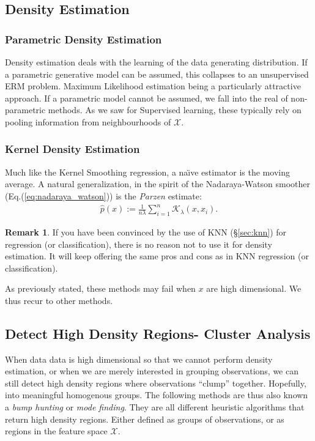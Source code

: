 \documentclass[12pt,a4paper]{article}
\theoremstyle{plain}
\theoremstyle{definition}
\newtheorem{remark}{Remark}
\newcommand{\naive}{na\"{\i}ve }
\newcommand{\pdf}{p}
\newcommand{\kernel}{\mathcal{K}}
\newcommand{\featureS}{\mathcal{X}}
\begin{document}
\subsection{Density Estimation}
\label{sec:density_estimation}

\subsubsection{Parametric Density Estimation}
Density estimation deals with the learning of the data generating distribution.
If a parametric generative model can be assumed, this collapses to an unsupervised ERM problem. 
Maximum Likelihood estimation being a particularly attractive approach.
If a parametric model cannot be assumed, we fall into the real of non-parametric methods. As we saw for Supervised learning, these typically rely on pooling information from neighbourhoods of $\featureS$.

\subsubsection{Kernel Density Estimation}

Much like the Kernel Smoothing regression, a \naive estimator is the moving average.
A natural generalization, in the spirit of the Nadaraya-Watson smoother (Eq.(\ref{eq:nadaraya_watson})) is the \emph{Parzen} estimate:
\begin{align}
\label{eq:parzen}
	\hat{\pdf}(x):=\frac{1}{n \lambda} \sum_{i=1}^n \kernel_\lambda(x,x_i).
\end{align}

\begin{remark}
If you have been convinced by the use of KNN (\S\ref{sec:knn}) for regression (or classification), there is no reason not to use it for density estimation. It will keep offering the same pros and cons as in KNN regression (or classification).
\end{remark}

As previously stated, these methods may fail when $x$ are high dimensional. We thus recur to other methods.


\subsection{Detect High Density Regions- Cluster Analysis}
When data data is high dimensional so that we cannot perform density estimation, or when we are merely interested in grouping observations, we can still detect high density regions where observations ``clump'' together. Hopefully, into meaningful homogenous groups.
The following methods are thus also known a \emph{bump hunting} or \emph{mode finding}.
They are all different heuristic algorithms that return high density regions. Either defined as groups of observations, or as regions in the feature space $\featureS$.
\end{document}
